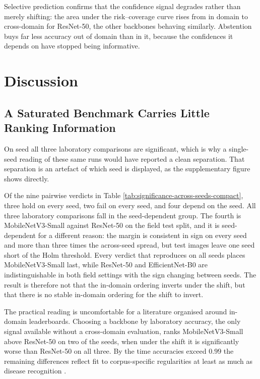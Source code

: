 \documentclass[runningheads]{llncs}
\begin{document}
Selective prediction confirms that the confidence signal degrades rather than
merely shifting: the area under the risk--coverage curve rises from
\AurcPvInRn{} in domain to \AurcXdRn{} cross-domain for ResNet-50, the other
backbones behaving similarly. Abstention buys far less accuracy out of domain
than in it, because the confidences it depends on have stopped being
informative.

\section{Discussion}

\subsection{A Saturated Benchmark Carries Little Ranking Information}

On seed \SigSeed{} all three laboratory comparisons are significant, which is why
a single-seed reading of these same runs would have reported a clean separation.
That separation is an artefact of which seed is displayed, as the supplementary
figure shows directly.

Of the nine pairwise verdicts in Table
\ref{tab:significance-across-seeds-compact}, three hold on every seed, two fail
on every seed, and four depend on the seed. All three laboratory comparisons
fall in the seed-dependent group. The fourth is MobileNetV3-Small against
ResNet-50 on the field test split, and it is seed-dependent for a different
reason: the margin is consistent in sign on every seed and more than three times
the across-seed spread, but \NPdcTest{} test images leave one seed short of the
Holm threshold. Every verdict that reproduces on all seeds places
MobileNetV3-Small last, while ResNet-50 and EfficientNet-B0 are indistinguishable
in both field settings with the sign changing between seeds. The result is
therefore not that the in-domain ordering inverts under the shift, but that
there is no stable in-domain ordering for the shift to invert.

The practical reading is uncomfortable for a literature organised around
in-domain leaderboards. Choosing a backbone by laboratory accuracy, the only
signal available without a cross-domain evaluation, ranks MobileNetV3-Small above
ResNet-50 on two of the \NSeedsDone{} seeds, when under the shift it is
significantly worse than ResNet-50 on all three. By the time accuracies exceed
$0.99$ the remaining differences reflect fit to corpus-specific regularities at
least as much as disease recognition
\cite{torralba2011bias,geirhos2020shortcut}.
\end{document}
